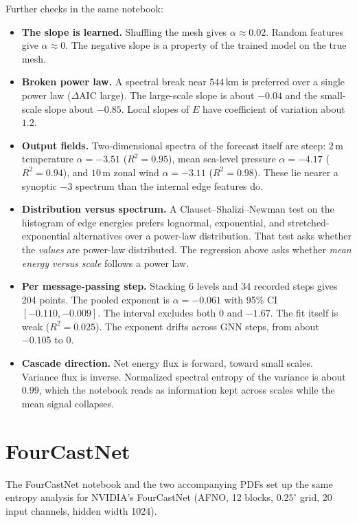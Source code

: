 \documentclass[11pt,a4paper]{article}
\begin{document}
Further checks in the same notebook:
\begin{itemize}
  \item \textbf{The slope is learned.} Shuffling the mesh gives \(\alpha \approx 0.02\). Random features give \(\alpha \approx 0\). The negative slope is a property of the trained model on the true mesh.
  \item \textbf{Broken power law.} A spectral break near \(544\,\mathrm{km}\) is preferred over a single power law (\(\Delta\mathrm{AIC}\) large). The large-scale slope is about \(-0.04\) and the small-scale slope about \(-0.85\). Local slopes of \(E\) have coefficient of variation about \(1.2\).
  \item \textbf{Output fields.} Two-dimensional spectra of the forecast itself are steep: \(2\,\mathrm{m}\) temperature \(\alpha = -3.51\) (\(R^2 = 0.95\)), mean sea-level pressure \(\alpha = -4.17\) (\(R^2 = 0.94\)), and \(10\,\mathrm{m}\) zonal wind \(\alpha = -3.11\) (\(R^2 = 0.98\)). These lie nearer a synoptic \(-3\) spectrum than the internal edge features do.
  \item \textbf{Distribution versus spectrum.} A Clauset--Shalizi--Newman test on the histogram of edge energies prefers lognormal, exponential, and stretched-exponential alternatives over a power-law distribution. That test asks whether the \emph{values} are power-law distributed. The regression above asks whether \emph{mean energy versus scale} follows a power law.
  \item \textbf{Per message-passing step.} Stacking 6 levels and 34 recorded steps gives 204 points. The pooled exponent is \(\alpha = -0.061\) with 95\% CI \([-0.110,-0.009]\). The interval excludes both \(0\) and \(-1.67\). The fit itself is weak (\(R^2 = 0.025\)). The exponent drifts across GNN steps, from about \(-0.105\) to \(0\).
  \item \textbf{Cascade direction.} Net energy flux is forward, toward small scales. Variance flux is inverse. Normalized spectral entropy of the variance is about \(0.99\), which the notebook reads as information kept across scales while the mean signal collapses.
\end{itemize}

\section{FourCastNet}
\label{sec:fcn}

The FourCastNet notebook and the two accompanying PDFs set up the same entropy analysis for NVIDIA's FourCastNet (AFNO, 12 blocks, \(0.25^\circ\) grid, 20 input channels, hidden width 1024).
\end{document}
